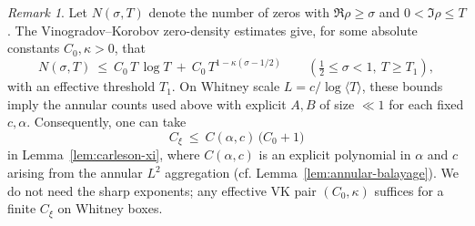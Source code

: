 \documentclass[11pt]{article}
\theoremstyle{definition}
\theoremstyle{remark}
\newtheorem{remark}[theorem]{Remark}
\begin{document}
\begin{remark}
Let $N(\sigma,T)$ denote the number of zeros with $\Re\rho\ge \sigma$ and $0<\Im\rho\le T$. The Vinogradov–Korobov zero-density estimates give, for some absolute constants $C_0,\kappa>0$, that
\[
  N(\sigma,T)\ \le\ C_0\,T\,\log T\ +\ C_0\,T^{1-\kappa(\sigma-1/2)}\qquad (\tfrac12\le \sigma<1,\ T\ge T_1),
\]
with an effective threshold $T_1$. On Whitney scale $L=c/\log\langle T\rangle$, these bounds imply the annular counts used above with explicit $A,B$ of size $\ll 1$ for each fixed $c,\alpha$. Consequently, one can take
\[
  C_\xi\ \le\ C(\alpha,c)\,\big(C_0+1\big)
\]
in Lemma~\ref{lem:carleson-xi}, where $C(\alpha,c)$ is an explicit polynomial in $\alpha$ and $c$ arising from the annular $L^2$ aggregation (cf. Lemma~\ref{lem:annular-balayage}). We do not need the sharp exponents; any effective VK pair $(C_0,\kappa)$ suffices for a finite $C_\xi$ on Whitney boxes.
\end{remark}
\end{document}
